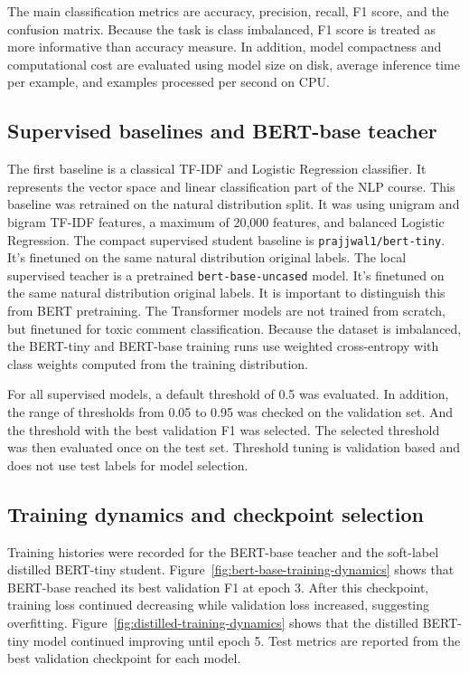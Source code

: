 \documentclass[pdflatex,sn-mathphys-num]{sn-jnl}
\begin{document}
The main classification metrics are accuracy, precision, recall, F1 score, and the confusion matrix. 
Because the task is class imbalanced, F1 score is treated as more informative than accuracy measure.
In addition, model compactness and computational cost are evaluated using model size on disk, average inference time per example, and examples processed per second on CPU.

\subsection{Supervised baselines and BERT-base teacher}

The first baseline is a classical TF-IDF and Logistic Regression classifier.
It represents the vector space and linear classification part of the NLP course.
This baseline was retrained on the natural distribution split.
It was using unigram and bigram TF-IDF features, a maximum of 20,000 features, and balanced Logistic Regression.
The compact supervised student baseline is \texttt{prajjwal1/bert-tiny}.
It's finetuned on the same natural distribution original labels.
The local supervised teacher is a pretrained \texttt{bert-base-uncased} model.
It's finetuned on the same natural distribution original labels.
It is important to distinguish this from BERT pretraining.
The Transformer models are not trained from scratch, but finetuned for toxic comment classification.
Because the dataset is imbalanced, the BERT-tiny and BERT-base training runs use weighted cross-entropy with class weights computed from the training distribution.

For all supervised models, a default threshold of 0.5 was evaluated.
In addition, the range of thresholds from 0.05 to 0.95 was checked on the validation set.
And the threshold with the best validation F1 was selected.
The selected threshold was then evaluated once on the test set.
Threshold tuning is validation based and does not use test labels for model selection.

\subsection{Training dynamics and checkpoint selection}

Training histories were recorded for the BERT-base teacher and the soft-label distilled BERT-tiny student.
Figure~\ref{fig:bert-base-training-dynamics} shows that BERT-base reached its best validation F1 at epoch 3.
After this checkpoint, training loss continued decreasing while validation loss increased, suggesting overfitting.
Figure~\ref{fig:distilled-training-dynamics} shows that the distilled BERT-tiny model continued improving until epoch 5.
Test metrics are reported from the best validation checkpoint for each model.
\end{document}
